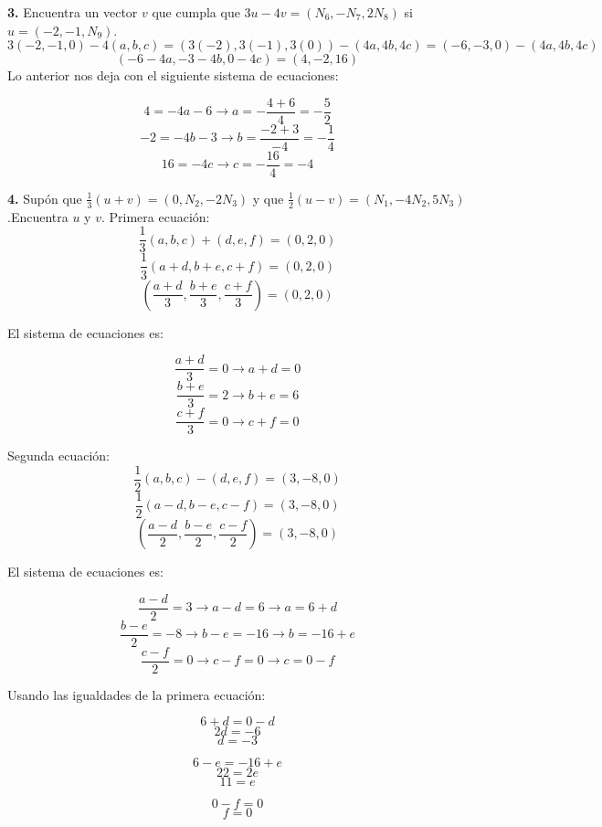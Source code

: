\documentclass{article}
\begin{document}
\newpage %

\textbf{3.} Encuentra un vector $v$ que cumpla que $3u - 4v = (N_6, -N_7, 2N_8)$ si $u = (-2, -1, N_9)$.
$$3(-2, -1, 0) - 4(a,b,c)=(3(-2), 3(-1),3(0))-(4a, 4b, 4c) = (-6, -3, 0) -(4a, 4b, 4c)$$
$$(-6-4a, -3-4b, 0-4c)= (4, -2, 16)$$
\textbullet Lo anterior nos deja con el siguiente sistema de ecuaciones:

$$4 = -4a-6 \rightarrow a = -\frac{4+6}{4} = -\frac{5}{2}$$ 
$$-2=-4b-3 \rightarrow b = \frac{-2+3}{-4} = -\frac{1}{4}$$
$$16= -4c  \rightarrow c = -\frac{16}{4} = -4$$ 

\textbf{4.} Supón que $\frac{1}{3}(u+v)=(0,N_2,-2N_3)$ y que $\frac{1}{2}(u-v)=(N_1,-4N_2,5N_3)$.Encuentra $u$ y $v$.
\textbullet Primera ecuación:
$$\frac{1}{3}(a, b, c) + (d, e, f) = (0, 2, 0)$$
$$\frac{1}{3}(a+d, b+e, c+f) = (0, 2, 0)$$
$$(\frac{a+d}{3}, \frac{b+e}{3}, \frac{c+f}{3}) = (0, 2, 0)$$

\textbullet El sistema de ecuaciones es: %

$$\frac{a+d}{3} = 0 \rightarrow a+d = 0 $$
$$\frac{b+e}{3} = 2 \rightarrow b+e = 6$$
$$\frac{c+f}{3} = 0 \rightarrow c+f = 0$$

\textbullet Segunda ecuación:
$$\frac{1}{2}(a, b, c) - (d, e, f) = (3, -8 , 0)$$
$$\frac{1}{2}(a-d, b-e, c-f) = (3, -8 , 0)$$
$$(\frac{a-d}{2}, \frac{b-e}{2}, \frac{c-f}{2}) = (3, -8 , 0)$$

\textbullet El sistema de ecuaciones es:

$$\frac{a-d}{2} = 3 \rightarrow a-d = 6 \rightarrow a = 6+d$$
$$\frac{b-e}{2} = -8 \rightarrow b-e = -16 \rightarrow b = -16 + e$$
$$\frac{c-f}{2} = 0 \rightarrow c-f = 0 \rightarrow c = 0 - f$$

\textbullet Usando las igualdades de la primera ecuación:

\begin{minipage}[c]{0.5cm} %
    $$6+d = 0-d$$
    $$2d=-6$$
    $$d=-3$$
\end{minipage} \hspace*{3cm} %
\begin{minipage}[c]{0.5cm}
    $$6-e = -16 +e $$
    $$22 = 2e$$
    $$11 = e$$
\end{minipage} \hspace*{3cm}
\begin{minipage}[c]{0.5cm}
    $$0- f = 0$$
    $$f = 0$$
\end{minipage}\newline
\end{document}
